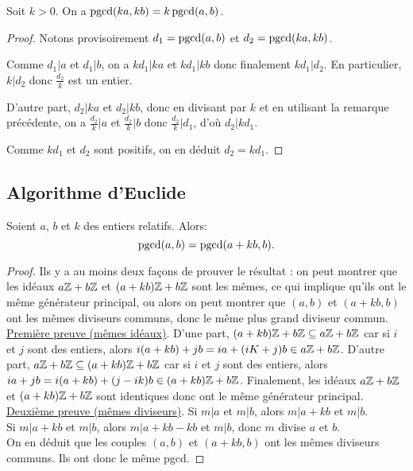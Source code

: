 \begin{proposition}
Soit $k>0$. On a $\operatorname{pgcd}(ka,kb)=k\operatorname{pgcd}(a,b)$.
\end{proposition}
\begin{proof}
Notons provisoirement $d_1 = \operatorname{pgcd}(a,b)$ et $d_2 = \operatorname{pgcd}(ka,kb)$.

Comme $d_1|a$ et $d_1|b$, on a $kd_1|ka$ et $kd_1|kb$ donc finalement $kd_1|d_2$. En  particulier, $k|d_2$ donc $\frac{d_2}{k}$ est un entier.

D'autre part, $d_2|ka$ et $d_2|kb$, donc  en divisant par $k$ et en utilisant la remarque précédente, on a $\frac{d_2}{k} | a$ et $\frac{d_2}{k} | b$ donc $\frac{d_2}{k} | d_1$, d'où $d_2 | kd_1$. 

Comme $kd_1$ et $d_2$ sont positifs, on en déduit $d_2=kd_1$.
\end{proof}

\subsection{Algorithme d'Euclide}

\begin{lemme}[d'Euclide]
Soient $a$, $b$ et $k$ des entiers relatifs. Alors:
\[ \operatorname{pgcd}(a,b) = \operatorname{pgcd}(a+kb,b).\]
\end{lemme}

\begin{proof}
Ils y a au moins deux façons de prouver le résultat : on peut montrer que les idéaux $a\mathbb{Z}+b\mathbb{Z}$ et $(a+kb)\mathbb{Z}+b\mathbb{Z}$ sont les mêmes, ce qui implique qu'ils ont le même générateur principal, ou alors on peut montrer que $(a,b)$ et $(a+kb,b)$ ont les mêmes diviseurs communs, donc le même plus grand diviseur commun.\\
\underline{Première preuve (mêmes idéaux)}.
D'une part, $(a+kb)\mathbb{Z}+b\mathbb{Z} \subseteq a\mathbb{Z}+b\mathbb{Z}$ car si $i$ et $j$ sont des entiers, alors $i(a+kb)+jb = ia+(iK+j)b \in a\mathbb{Z}+b\mathbb{Z}$.
D'autre part, $a\mathbb{Z}+b\mathbb{Z} \subseteq (a+kb)\mathbb{Z}+b\mathbb{Z}$ car si $i$ et $j$ sont des entiers, alors $ia+jb = i(a+kb) +(j-ik)b \in (a+kb)\mathbb{Z}+b\mathbb{Z}$.
Finalement, les idéaux $a\mathbb{Z}+b\mathbb{Z}$ et $(a+kb)\mathbb{Z}+b\mathbb{Z}$ sont identiques donc ont le même générateur principal.\\
\underline{Deuxième preuve (mêmes diviseurs)}.
Si $m|a$ et $m|b$, alors $m|a+kb$ et $m|b$.\\
Si $m|a+kb$ et $m|b$, alors $m|a+kb-kb$ et $m|b$, donc $m$ divise $a$ et $b$.\\
On en déduit que les couples $(a,b)$ et $(a+kb,b)$ ont les mêmes diviseurs communs. Ils ont donc le même pgcd.
\end{proof}

